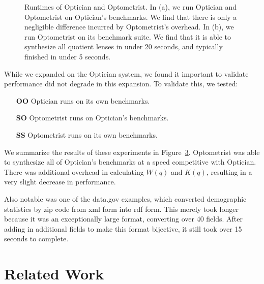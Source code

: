 \documentclass{svproc}
\newcommand{\Name}{Optometrist}
\newcommand{\OpticianRuntime}{\textbf{OO}}
\newcommand{\SystemOnOptician}{\textbf{SO}}
\newcommand{\SystemOnBenchmarks}{\textbf{SS}}
\begin{document}
\begin{figure}
  \centering
  \begin{subfigure}[b]{.49\textwidth}
    \centering
    \caption{}
    \label{subfig:lenssize}
  \end{subfigure}
  \begin{subfigure}[b]{.49\textwidth}
    \caption{}
    \label{subfig:examplesused}
  \end{subfigure}
  \caption{Runtimes of Optician and \Name{}.
    In (a), we run Optician and \Name{} on Optician's benchmarks.  We find that
    there is only a negligible difference incurred by Optometrist's overhead.
    In (b), we run Optometrist on its benchmark suite.  We find that it is able
    to synthesize all quotient lenses in under 20 seconds, and typically
    finished in under 5 seconds. }
  \label{fig:times}
\end{figure}

While we expanded on the Optician system, we found it important to validate
performance did not degrade in this expansion.  To validate this, we tested:
\begin{itemize}
\item[\OpticianRuntime{}] Optician runs on its own benchmarks.
\item[\SystemOnOptician{}] \Name{} runs on Optician's benchmarks.
\item[\SystemOnBenchmarks{}] \Name{} runs on its own benchmarks.
\end{itemize}

We summarize the results of these experiments in Figure~\ref{fig:times}.
\Name{} was
able to synthesize all of Optician's benchmarks at a speed competitive with
Optician.  There was additional overhead in calculating $W(q)$ and $K(q)$,
resulting in a very slight decrease in performance.

Also notable was one of the data.gov examples, which converted demographic
statistics by zip code from xml form into rdf form.  This merely took longer because it was
an exceptionally large format, converting over 40 fields.  After adding in additional
fields to make this format bijective, it still took over 15 seconds to complete.

\section{Related Work}
\label{relwork} 
\end{document}

